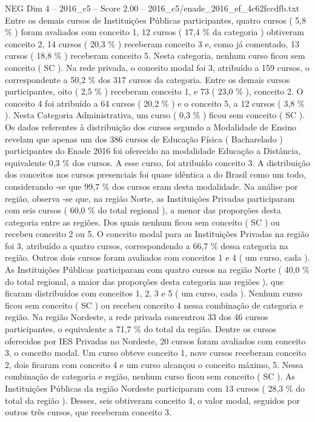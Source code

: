 \begin{textsample}{NEG Dim 4 – 2016\_c5 – Score 2.00 – 2016\_c5/enade\_2016\_ef\_4c62fccdfb.txt}
Entre os demais cursos de Instituições Públicas participantes, quatro cursos ( 5,8 \% ) foram avaliados com conceito 1, 12 cursos ( 17,4 \% da categoria ) obtiveram conceito 2, 14 cursos ( 20,3 \% ) receberam conceito 3 e, como já comentado, 13 cursos ( 18,8 \% ) receberam conceito 5.
Nesta categoria, nenhum curso ficou sem conceito ( SC ).
Na rede privada, o conceito modal foi 3, atribuído a 159 cursos, o correspondente a 50,2 \% dos 317 cursos da categoria.
Entre os demais cursos participantes, oito ( 2,5 \% ) receberam conceito 1, e 73 ( 23,0 \% ), conceito 2.
O conceito 4 foi atribuído a 64 cursos ( 20,2 \% ) e o conceito 5, a 12 cursos ( 3,8 \% ).
Nesta Categoria Administrativa, um curso ( 0,3 \% ) ficou sem conceito ( SC ).
Os dados referentes à distribuição dos cursos segundo a Modalidade de Ensino revelam que apenas um dos 386 cursos de Educação Física ( Bacharelado ) participantes do Enade 2016 foi oferecido na modalidade Educação a Distância, equivalente 0,3 \% dos cursos.
A esse curso, foi atribuído conceito 3.
A distribuição dos conceitos nos cursos presenciais foi quase idêntica a do Brasil como um todo, considerando -se que 99,7 \% dos cursos eram desta modalidade.
Na análise por região, observa -se que, na região Norte, as Instituições Privadas participaram com seis cursos ( 60,0 \% do total regional ), a menor das proporções desta categoria entre as regiões.
Dos quais nenhum ficou sem conceito ( SC ) ou recebeu conceito 2 ou 5.
O conceito modal para as Instituições Privadas na região foi 3, atribuído a quatro cursos, correspondendo a 66,7 \% dessa categoria na região.
Outros dois cursos foram avaliados com conceitos 1 e 4 ( um curso, cada ).
As Instituições Públicas participaram com quatro cursos na região Norte ( 40,0 \% do total regional, a maior das proporções desta categoria nas regiões ), que ficaram distribuídos com conceitos 1, 2, 3 e 5 ( um curso, cada ).
Nenhum curso ficou sem conceito ( SC ) ou recebeu conceito 4 nessa combinação de categoria e região.
Na região Nordeste, a rede privada concentrou 33 dos 46 cursos participantes, o equivalente a 71,7 \% do total da região.
Dentre os cursos oferecidos por IES Privadas no Nordeste, 20 cursos foram avaliados com conceito 3, o conceito modal.
Um curso obteve conceito 1, nove cursos receberam conceito 2, dois ficaram com conceito 4 e um curso alcançou o conceito máximo, 5.
Nessa combinação de categoria e região, nenhum curso ficou sem conceito ( SC ).
As Instituições Públicas da região Nordeste participaram com 13 cursos ( 28,3 \% do total da região ).
Desses, seis obtiveram conceito 4, o valor modal, seguidos por outros três cursos, que receberam conceito 3.

\end{textsample}
